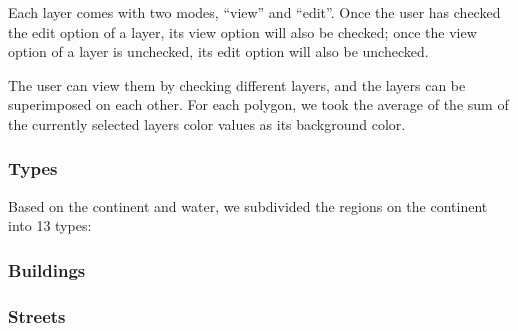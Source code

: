 Each layer comes with two modes, ``view'' and ``edit''. Once the user has checked the edit option of a layer, its view option will also be checked; once the view option of a layer is unchecked, its edit option will also be unchecked.

The user can view them by checking different layers, and the layers can be superimposed on each other. For each polygon, we took the average of the sum of the currently selected layers color values as its background color.

\subsubsection{Types}
Based on the continent and water, we subdivided the regions on the continent into 13 types:

\subsubsection{Buildings}


\subsubsection{Streets}
